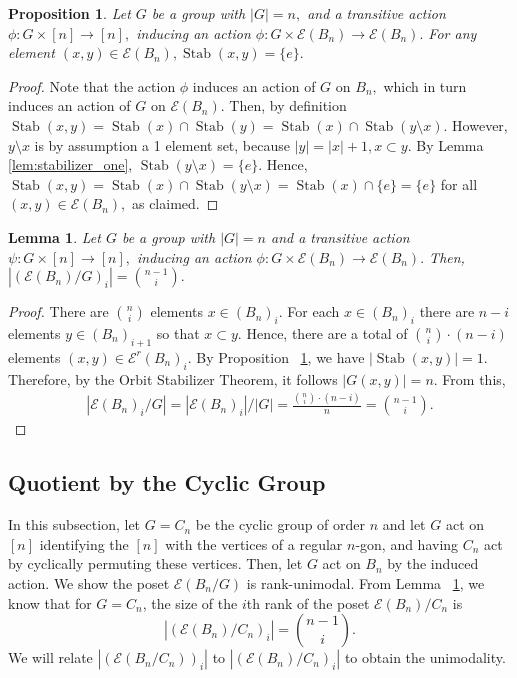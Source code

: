 \documentclass[10 pt]{amsart}
\theoremstyle{plain}
\newtheorem{prop}[thm]{Proposition}
\newtheorem{lem}[thm]{Lemma}
\theoremstyle{definition}
\theoremstyle{remark}
\numberwithin{equation}{section}
\newcommand\ssec{\subsection}
\def\Stab{\operatorname{Stab}}
\begin{document}
\begin{prop}
\label{prop:stabilizer_edge}
Let $G$ be a group with $|G| = n,$ and a transitive action $\phi:G \times [n] \rightarrow [n],$ inducing an action $\phi:G \times \mathcal E(B_n)\rightarrow \mathcal E(B_n).$ For any element $(x , y) \in \mathcal E(B_n),\Stab(x, y) = \{e\}.$
\end{prop}
\begin{proof}
Note that the action $\phi$ induces an action of $G$ on $B_n,$ which in turn induces an action of $G$ on $\mathcal E(B_n).$ Then, by definition $\Stab(x, y) = \Stab(x) \cap \Stab(y) = \Stab(x) \cap \Stab(y \setminus x).$ However, $y \setminus x$ is by assumption a 1 element set, because $|y| = |x| +1,x \subset y.$ By Lemma \ref{lem:stabilizer_one}, $\Stab(y\setminus x) = \{e\}.$ Hence, $\Stab(x, y)=\Stab(x) \cap \Stab(y \setminus x) = \Stab(x) \cap \{e\} = \{e\}$ for all $(x, y) \in \mathcal E(B_n),$ as claimed.
\end{proof}

\begin{lem}
\label{lem:q_counts}
Let $G$ be a group with $|G| = n$ and a transitive action $\psi:G \times [n] \rightarrow [n],$ inducing an action $\phi:G \times \mathcal E(B_n)\rightarrow \mathcal E(B_n).$ Then, $\displaystyle |(\mathcal E(B_n)/G)_i| = \binom{n-1}{i}.$
\end{lem}
\begin{proof}
There are $\binom{n}{i}$ elements $x\in(B_n)_i.$ For each $x \in (B_n)_i$ there are $n-i$ elements $y \in (B_n)_{i+1}$ so that $x \subset y.$ Hence, there are a total of $\binom{n}{i}\cdot (n-i)$ elements $(x, y) \in \mathcal E^r(B_n)_i.$ By Proposition ~\ref{prop:stabilizer_edge}, we have $|\Stab(x, y)| = 1.$ Therefore, by the Orbit Stabilizer Theorem, it follows $|G(x, y)| = n.$ From this,
\begin{align*}
|\mathcal E(B_n)_i/G| = |\mathcal E(B_n)_i|/|G| = \frac{\binom{n}{i}\cdot (n-i)}{n} = \binom {n-1}{i}.
\end{align*}
\end{proof}






\ssec{Quotient by the Cyclic Group}
\label{sec:cyclic}

In this subsection, let $G = C_n$ be the cyclic group of order $n$ and let $G$ act on $[n]$ identifying the $[n]$ with the vertices of a regular $n$-gon, and having $C_n$ act by cyclically permuting these vertices. Then, let $G$ act on $B_n$ by the induced action. We show the poset $ \mathcal E(B_n/G)$ is rank-unimodal. From Lemma ~\ref{lem:q_counts}, we know that for $G = C_n$, the size of the $i$th rank of the poset $ \mathcal E (B_n)/C_n$ is $$|( \mathcal E (B_n)/C_n)_i| = \binom{n-1}{i}.$$
We will relate $|( \mathcal E(B_n/C_n))_i|$ to $|( \mathcal E (B_n)/C_n)_i|$ to obtain the unimodality. 
\end{document}

